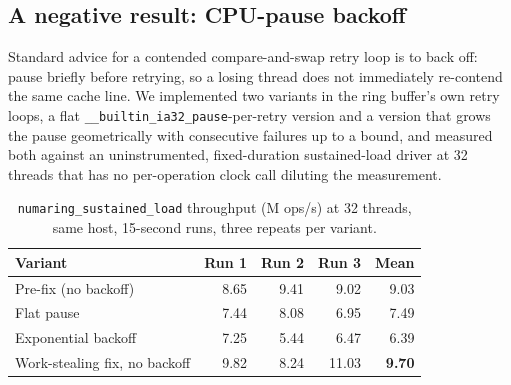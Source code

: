 \documentclass[10pt,journal,compsoc]{IEEEtran}
\begin{document}
\subsection{A negative result: CPU-pause backoff}
\label{sec:eval-backoff}

Standard advice for a contended compare-and-swap retry loop is to back off: pause briefly before
retrying, so a losing thread does not immediately re-contend the same cache line. We implemented
two variants in the ring buffer's own retry loops, a flat \texttt{\_\_builtin\_ia32\_pause}-per-retry
version and a version that grows the pause geometrically with consecutive failures up to a bound,
and measured both against an uninstrumented, fixed-duration sustained-load driver at 32 threads
that has no per-operation clock call diluting the measurement.

\begin{table}[t]
\caption{\texttt{numaring\_sustained\_load} throughput (M ops/s) at 32 threads, same host,
15-second runs, three repeats per variant.}
\label{tab:backoff}
\centering\small
\begin{tabular}{lrrrr}
\toprule
Variant & Run 1 & Run 2 & Run 3 & Mean \\
\midrule
Pre-fix (no backoff)     & 8.65 & 9.41  & 9.02  & 9.03 \\
Flat pause               & 7.44 & 8.08  & 6.95  & 7.49 \\
Exponential backoff      & 7.25 & 5.44  & 6.47  & 6.39 \\
Work-stealing fix, no backoff & 9.82 & 8.24 & 11.03 & \textbf{9.70} \\
\bottomrule
\end{tabular}
\end{table}
\end{document}
